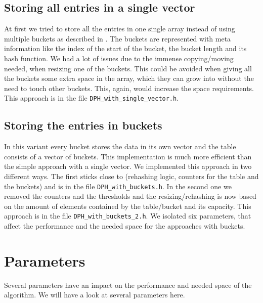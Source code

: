 \documentclass{article}
\begin{document}
\subsection{Storing all entries in a single vector}

At first we tried to store all the entries in one single array instead of using multiple buckets as described in \cite[p. 94]{mesa08}. The buckets are represented with meta information like the index of the start of the bucket, the bucket length and its hash function. We had a lot of issues due to the immense copying/moving needed, when resizing one of the buckets. This could be avoided when giving all the buckets some extra space in the array, which they can grow into without the need to touch other buckets. This, again, would increase the space requirements. This approach is in the file \texttt{DPH\_with\_single\_vector.h}.

\subsection{Storing the entries in buckets}

In this variant every bucket stores the data in its own vector and the table consists of a vector of buckets. This implementation is much more efficient than the simple approach with a single vector. We implemented this approach in two different ways. The first sticks close to \cite{di94} (rehashing logic, counters for the table and the buckets) and is in the file \texttt{DPH\_with\_buckets.h}. In the second one we removed the counters and the thresholds and the resizing/rehashing is now based on the amount of elements contained by the table/bucket and its capacity. This approach is in the file \texttt{DPH\_with\_buckets\_2.h}. We isolated six parameters, that affect the performance and the needed space for the approaches with buckets.

\section{Parameters}

Several parameters have an impact on the performance and needed space of the
algorithm. We will have a look at several parameters here.
\end{document}
